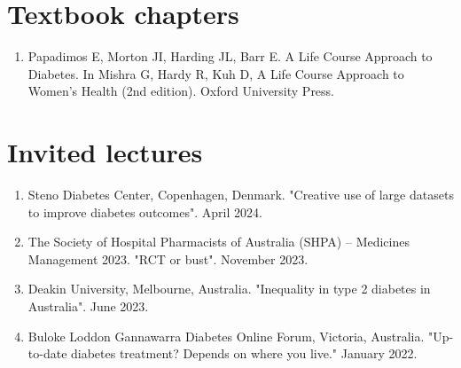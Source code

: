 \documentclass[11pt]{article}
\begin{document}
\section*{Textbook chapters}
\begin{enumerate}
\item Papadimos E, Morton JI, Harding JL, Barr E. 
A Life Course Approach to Diabetes. 
In Mishra G, Hardy R, Kuh D, A Life Course Approach to Women's Health (2nd edition). 
Oxford University Press.  
\end{enumerate}

\section*{Invited lectures}
\begin{enumerate}
\item Steno Diabetes Center, Copenhagen, Denmark. "Creative use of large datasets to improve diabetes outcomes". April 2024.
\item The Society of Hospital Pharmacists of Australia (SHPA) – Medicines Management 2023. "RCT or bust". November 2023.
\item Deakin University, Melbourne, Australia. "Inequality in type 2 diabetes in Australia". June 2023. 
\item Buloke Loddon Gannawarra Diabetes Online Forum, Victoria, Australia. "Up-to-date diabetes treatment? Depends on where you live." January 2022.  
\end{enumerate}
\end{document}
